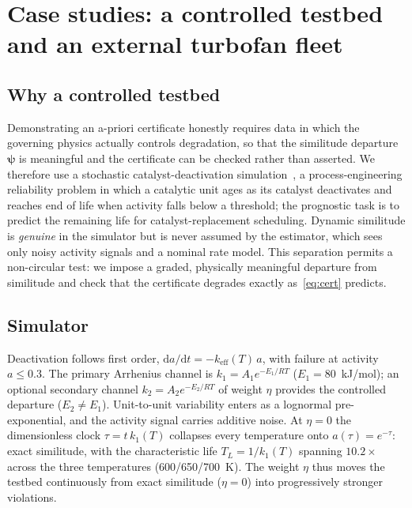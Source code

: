 \section{Case studies: a controlled testbed and an external turbofan fleet}\label{sec:design}
\subsection{Why a controlled testbed}\label{sec:why}
Demonstrating an a-priori certificate honestly requires data in which the governing physics actually
controls degradation, so that the similitude departure $\boldsymbol\psi$ is meaningful and the
certificate can be checked rather than asserted. We therefore use a stochastic catalyst-deactivation
simulation~\cite{levenspiel1999chemical,perry2008handbook}, a process-engineering reliability problem
in which a catalytic unit ages as its catalyst deactivates and reaches end of life when activity
falls below a threshold; the prognostic task is to predict the remaining life for catalyst-replacement
scheduling. Dynamic similitude is \emph{genuine} in the simulator but is never assumed by the
estimator, which sees only noisy activity signals and a nominal rate model. This separation permits a
non-circular test: we impose a graded, physically meaningful departure from similitude and check that
the certificate degrades exactly as~\eqref{eq:cert} predicts.

\subsection{Simulator}\label{sec:sim}
Deactivation follows first order, $\mathrm{d}a/\mathrm{d}t=-k_{\mathrm{eff}}(T)\,a$, with failure at
activity $a\le0.3$. The primary Arrhenius channel is $k_1=A_1e^{-E_1/RT}$ ($E_1=80$~kJ/mol); an
optional secondary channel $k_2=A_2e^{-E_2/RT}$ of weight $\eta$ provides the controlled departure
($E_2\neq E_1$). Unit-to-unit variability enters as a lognormal pre-exponential, and the activity
signal carries additive noise. At $\eta=0$ the dimensionless clock $\tau=t\,k_1(T)$ collapses every
temperature onto $a(\tau)=e^{-\tau}$: exact similitude, with the characteristic life $T_L=1/k_1(T)$
spanning $10.2\times$ across the three temperatures (600/650/700~K). The weight $\eta$ thus moves the
testbed continuously from exact similitude ($\eta=0$) into progressively stronger violations.

